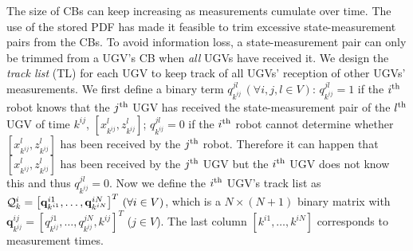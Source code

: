 	
	The size of CBs can keep increasing as measurements cumulate over time. 
	\textcolor{\revcol}{The use of the stored PDF has made it feasible to trim excessive state-measurement pairs from the CBs.}
	To avoid information loss, a state-measurement pair can only be trimmed from a UGV's CB when \textit{all} UGVs have received it.
	\textcolor{\revcol}{We design the \textit{track list} (TL) for each UGV to keep track of all UGVs' reception of other UGVs' measurements.
	We first define a binary term $q^{jl}_{k^{ij}}\,(\forall i,j,l\in V)$: $q^{jl}_{k^{ij}}=1$ if the $i^\text{th}$ robot knows that the $j^\text{th}$ UGV has received the state-measurement pair of the $l^\text{th}$ UGV of time $k^{ij}$, $\left[x^l_{k^{ij}},z^l_{k^{ij}}\right]$; $q^{jl}_{k^{ij}}=0$ if the $i^\text{th}$ robot cannot determine whether $\left[x^l_{k^{ij}},z^l_{k^{ij}}\right]$ has been received by the $j^\text{th}$ robot.}
	Therefore \textcolor{\revcol}{it can happen that $\left[x^l_{k^{ij}},z^l_{k^{ij}}\right]$ has been received by the $j^\text{th}$ UGV but the $i^\text{th}$ UGV does not know this and thus $q^{jl}_{k^{ij}}=0$.
	Now we define the $i^\text{th}$ UGV's track list as $\mathcal{Q}^i_k=\left[\mathbf{q}^{i1}_{k^{i1}},\dots, \mathbf{q}^{iN}_{k^{iN}}\right]^T \,(\forall i\in V)$, which is a $N\times (N+1)$ binary matrix with
	$\mathbf{q}^{ij}_{k^{ij}}=\left[q^{j1}_{k^{ij}},\dots,q^{jN}_{k^{ij}},k^{ij}\right]^T$ ($j\in V$).
	The last column $\left[k^{i1},\dots,k^{iN}\right]$ corresponds to measurement times.}
